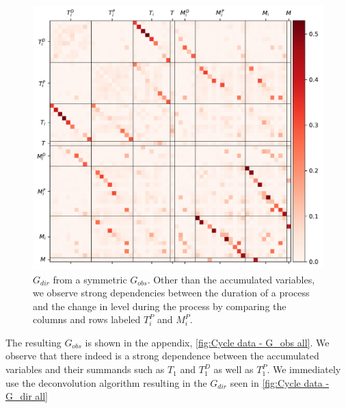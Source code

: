 \documentclass[../Thesis.tex]{subfiles}
\begin{document}
\begin{figure}[H]
    \centering
    \includegraphics[width = .9\linewidth]{figures/Cycle data/G_dir complete - symmetric.pdf}
    \caption{$G_{dir}$ from a symmetric $G_{obs}$. Other than the accumulated variables, we observe strong dependencies between the duration of a process and the change in level during the process by comparing the columns and rows labeled $T^P_i$ and $M^P_i$.}
    \label{fig:Cycle data - G_dir all}
\end{figure}

The resulting $G_{obs}$ is shown in the appendix, \autoref{fig:Cycle data - G_obs all}. We observe that there indeed is a strong dependence between the accumulated variables and their summands such as $T_1$ and $T^D_1$ as well as $T^P_1$. We immediately use the deconvolution algorithm resulting in the $G_{dir}$ seen in \autoref{fig:Cycle data - G_dir all}
\end{document}
